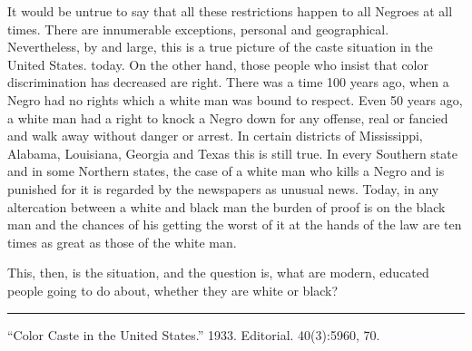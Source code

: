 \documentclass[letterpaper,10pt,english]{jupyterBook}
\begin{document}
\sphinxAtStartPar
It would be untrue to say that all these restrictions happen to all Negroes at all times. There are innumerable exceptions, personal and geographical. Nevertheless, by and large, this is a true picture of the caste situation in the United States. today. On the other hand, those people who insist that color discrimination has decreased are right. There was a time 100 years ago, when a Negro had no rights which a white man was bound to respect. Even 50 years ago, a white man had a right to knock a Negro down for any offense, real or fancied and walk away without danger or arrest. In certain districts of Mississippi, Alabama, Louisiana, Georgia and Texas this is still true. In every Southern state and in some Northern states, the case of a white man who kills a Negro and is punished for it is regarded by the newspapers as unusual news. Today, in any altercation between a white and black man the burden of proof is on the black man and the chances of his getting the worst of it at the hands of the law are ten times as great as those of the white man.

\sphinxAtStartPar
This, then, is the situation, and the question is, what are modern, educated people going to do about, whether they are white or black?


\bigskip\hrule\bigskip


\sphinxAtStartPar
{} “Color Caste in the United States.” 1933. Editorial.  40(3):59\sphinxhyphen{}60, 70.
\end{document}
